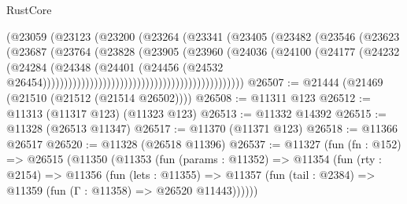 \begin{lexlean}{RustCore}
\begin{coremodule}
                                                    (@23059
                                                      (@23123
                                                        (@23200
                                                          (@23264
                                                            (@23341
                                                              (@23405
                                                                (@23482
                                                                  (@23546
                                                                    (@23623
                                                                      (@23687
                                                                        (@23764
                                                                          (@23828
                                                                            (@23905
                                                                              (@23960
                                                                                (@24036
                                                                                  (@24100
                                                                                    (@24177
                                                                                      (@24232
                                                                                        (@24284
                                                                                          (@24348
                                                                                            (@24401
                                                                                              (@24456
                                                                                                (@24532
                                                                                                  @26454)))))))))))))))))))))))))))))))))))))))))))))))
@26507 := @21444 (@21469 (@21510 (@21512 (@21514 @26502))))
@26508 := @11311 @123
@26512 := @11313 (@11317 @123) (@11323 @123)
@26513 := @11332 @14392
@26515 := @11328 (@26513 @11347)
@26517 := @11370 (@11371 @123)
@26518 := @11366 @26517
@26520 := @11328 (@26518 @11396)
@26537 := @11327
    (fun (fn : @152) =>
    @26515
      (@11350
        (@11353
          (fun (params : @11352) =>
          @11354
            (fun (rty : @2154) =>
            @11356
              (fun (lets : @11355) =>
              @11357 (fun (tail : @2384) => @11359 (fun (Γ : @11358) => @26520 @11443))))))

\end{coremodule}
\end{lexlean}
